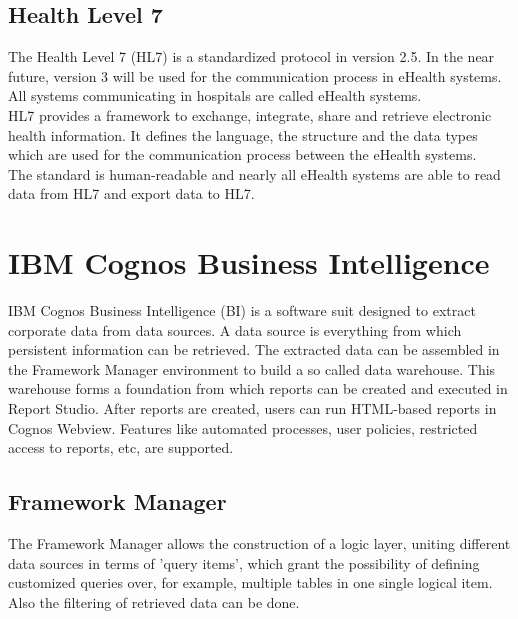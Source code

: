 \documentclass[a4paper]{article}
\begin{document}
	\subsection{Health Level 7}
		The Health Level 7 (HL7) is a standardized protocol in version 2.5. In
		the near future, version 3 will be used for the communication  process in
		eHealth systems.
		All systems communicating in hospitals are called eHealth
		systems.\\
		HL7 provides a framework to exchange, integrate, share and retrieve 
		electronic health information. It defines the language, the structure and the
		data types which are used for the communication process between the eHealth
		systems.\\
		The standard is human-readable and nearly all eHealth systems are able to
		read data from HL7 and export data to HL7.
		
	\newpage
	
	\section{IBM Cognos Business Intelligence}
	IBM Cognos Business Intelligence (BI) is a software suit designed to extract
	corporate data from data sources. A data source is everything from which
	persistent information can be retrieved. The extracted data can be assembled in
	the Framework Manager environment to build a so called data warehouse. This
	warehouse forms a foundation from which reports can be created and executed in
	Report Studio. After reports are created, users can run HTML-based reports in
	Cognos Webview. Features like automated processes, user policies, restricted
	access to reports, etc, are supported.
	
	\subsection{Framework Manager}
	The Framework Manager allows the construction of a logic layer, uniting different data sources in terms of 'query
	items', which grant the possibility of defining customized queries over, for
	example, multiple tables in one single logical item. Also the filtering of
	retrieved data can be done.
\end{document}
